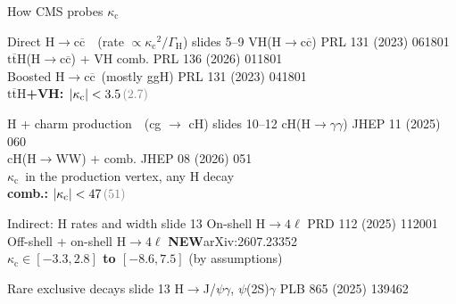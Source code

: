 \documentclass[aspectratio=169,10pt,xcolor=table]{beamer}
\newcommand{\qbar}[1]{\mathrm{#1}\overline{\mathrm{#1}}}
\newcommand{\kc}{\ensuremath{\kappa_\mathrm{c}}}
\newcommand{\Hcc}{\ensuremath{\mathrm{H}\to\qbar{c}}}
\newcommand{\ttH}{\ensuremath{\qbar{t}\mathrm{H}}}
\newcommand{\new}{{\color{accB}\textbf{\scriptsize NEW}}}
\newcommand{\obsexp}[2]{#1\,{\color{gray}(#2)}}
\newcommand{\up}{\vspace*{-0.8em}}
\newcommand{\rref}[1]{\hfill{\scriptsize\color{gray}#1}}
\begin{document}
\begin{frame}[t]{How CMS probes \kc}
  \up
  \begin{minipage}[t]{0.495\linewidth}
    \begin{outbox}[equal height group=road1,fontupper=\footnotesize]{Direct \Hcc\ \ (rate $\propto\kc^2/\Gamma_\mathrm{H}$) \quad slides 5--9}
      VH(\Hcc) \rref{PRL 131 (2023) 061801}\\
      \ttH(\Hcc) + VH comb. \rref{PRL 136 (2026) 011801}\\
      Boosted \Hcc\ (mostly ggH) \rref{PRL 131 (2023) 041801}\\[2pt]
      {\color{accB}\textbf{\ttH+VH: $|\kc|<\obsexp{3.5}{2.7}$}}
    \end{outbox}
  \end{minipage}\hfill
  \begin{minipage}[t]{0.495\linewidth}
    \begin{outbox}[equal height group=road1,fontupper=\footnotesize]{H + charm production\ \ (cg $\to$ cH) \quad slides 10--12}
      cH(H$\to\gamma\gamma$) \rref{JHEP 11 (2025) 060}\\
      cH(H$\to$WW) + comb. \rref{JHEP 08 (2026) 051}\\[2pt]
      \kc\ in the production vertex, any H decay\\[2pt]
      {\color{accB}\textbf{comb.: $|\kc|<\obsexp{47}{51}$}}
    \end{outbox}
  \end{minipage}\par\vspace{8pt}
  \begin{minipage}[t]{0.495\linewidth}
    \begin{outbox}[equal height group=road2,fontupper=\footnotesize]{Indirect: H rates and width \quad slide 13}
      On-shell H$\to4\ell$ \rref{PRD 112 (2025) 112001}\\
      Off-shell + on-shell H$\to4\ell$ \new \rref{arXiv:2607.23352}\\[2pt]
      {\color{accB}\textbf{$\kc\in[-3.3,2.8]$ to $[-8.6,7.5]$}} {\scriptsize(by assumptions)}
    \end{outbox}
  \end{minipage}\hfill
  \begin{minipage}[t]{0.495\linewidth}
    \begin{outbox}[equal height group=road2,fontupper=\footnotesize]{Rare exclusive decays \quad slide 13}
      H$\to$J/$\psi\gamma$, $\psi$(2S)$\gamma$ \rref{PLB 865 (2025) 139462}\\

\end{outbox}
\end{minipage}
\end{frame}
\end{document}
